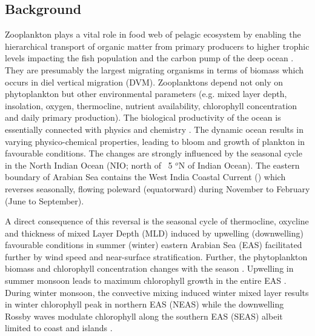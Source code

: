 \documentclass{article}
\begin{document}
	\subsection{Background}
	Zooplankton plays a vital role in food web of pelagic ecosystem by enabling the hierarchical transport of organic matter from primary producers to higher trophic levels impacting the fish population \citep{ohman2001density} and the carbon pump of the deep ocean \citep{le2016global}. They are presumably the largest migrating organisms in terms of biomass \citep{hays2003review} which occurs in diel vertical migration (DVM). Zooplanktons depend not only on phytoplankton but other environmental parameters (e.g. mixed layer depth, insolation, oxygen, thermocline, nutrient availability, chlorophyll concentration and daily primary production). The biological productivity of the ocean is essentially connected with physics and chemistry \citep{subrahmanyan1959studiespart2, ryther1966primary, qasim1977biological, nair1970primary,banse1995zooplankton,mccreary2009biophysical, vijith2016consequences,amol2020modulation}. The dynamic ocean results in varying physico-chemical properties, leading to bloom and growth of plankton in favourable conditions. The changes are strongly influenced by the seasonal cycle in the North Indian Ocean (NIO; north of ~5 $^o$N of Indian Ocean). The eastern boundary of Arabian Sea contains the West India Coastal Current (\citep[WICC]{ramamirtham1965hydrography, banse1968hydrography, shetye1990hydrography,mccreary1993numerical, amol2014observed, vijith2016consequences, chaudhuri2020observed}) which reverses seasonally, flowing poleward (equatorward) during November to February (June to September). 
	
	A direct consequence of this reversal is the seasonal cycle of thermocline, oxycline and thickness of mixed Layer Depth (MLD) induced by upwelling (downwelling) favourable conditions in summer (winter) eastern Arabian Sea (EAS) facilitated further by wind speed and near-surface stratification. Further, the phytoplankton biomass and chlorophyll concentration changes with the season \citep{subrahmanyan1960studies, banse1968hydrography, levy2007basin, vijith2016consequences}. Upwelling in  summer monsoon leads to maximum chlorophyll growth in the entire EAS \citep{ banse1968hydrography, banse2000geographical, mccreary2009biophysical, hood2017biogeochemical,shi2022phytoplankton}. During winter monsoon, the convective mixing induced winter mixed layer \citep{shetye1992does, madhupratap1996mechanism,mccreary1996four, levy2007basin,  shankar2016inhibition, vijith2016consequences, keerthi2017physical,shi2022phytoplankton} results in winter chlorophyll peak in northern EAS (NEAS) while the downwelling Rossby waves modulate chlorophyll along the southern EAS (SEAS) albeit limited to coast and islands \citep{amol2020modulation}. 
	
\end{document}
